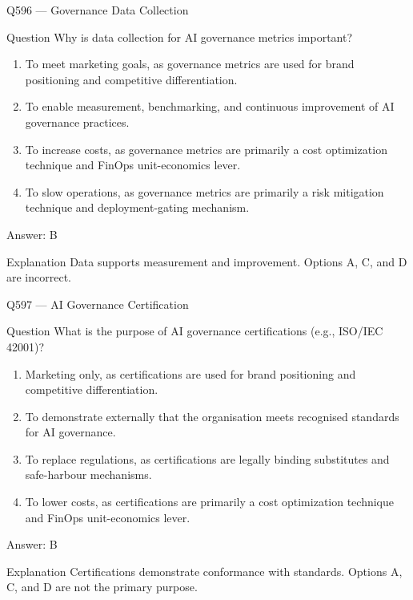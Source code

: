 \documentclass[aspectratio=169,8pt]{beamer}
\begin{document}
	\begin{frame}{Q596 --- Governance Data Collection}
		\begin{block}{Question}
			Why is data collection for AI governance metrics important?
			\begin{enumerate}
				\item To meet marketing goals, as governance metrics are used for brand positioning and competitive differentiation.
				\item To enable measurement, benchmarking, and continuous improvement of AI governance practices.
				\item To increase costs, as governance metrics are primarily a cost optimization technique and FinOps unit-economics lever.
				\item To slow operations, as governance metrics are primarily a risk mitigation technique and deployment-gating mechanism.
			\end{enumerate}
		\end{block}
		\begin{exampleblock}{Answer: B}\end{exampleblock}
		\begin{block}{Explanation}
			Data supports measurement and improvement. Options A, C, and D are incorrect.
		\end{block}
	\end{frame}
	
	\begin{frame}{Q597 --- AI Governance Certification}
		\begin{block}{Question}
			What is the purpose of AI governance certifications (e.g., ISO/IEC 42001)?
			\begin{enumerate}
				\item Marketing only, as certifications are used for brand positioning and competitive differentiation.
				\item To demonstrate externally that the organisation meets recognised standards for AI governance.
				\item To replace regulations, as certifications are legally binding substitutes and safe-harbour mechanisms.
				\item To lower costs, as certifications are primarily a cost optimization technique and FinOps unit-economics lever.
			\end{enumerate}
		\end{block}
		\begin{exampleblock}{Answer: B}\end{exampleblock}
		\begin{block}{Explanation}
			Certifications demonstrate conformance with standards. Options A, C, and D are not the primary purpose.
		\end{block}
	\end{frame}
	
\end{document}
